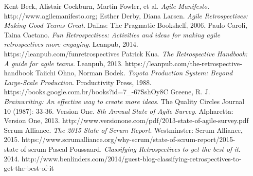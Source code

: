 \begin{thebibliography}{7} 

 Kent Beck, Alistair Cockburn, Martin Fowler, et al. \textit{Agile Manifesto}. http://www.agilemanifesto.org;
 Esther Derby, Diana Larsen. \textit{Agile Retrospectives: Making Good Teams Great}. Dallas: The Pragmatic Bookshelf, 2006.
 Paulo Caroli, Taina Caetano. \textit{Fun Retrospectives: Activities and ideas for making agile retrospectives more engaging}. Leanpub, 2014. https://leanpub.com/funretrospectives
 Patrick Kua. \textit{The Retrospective Handbook: A guide for agile teams}. Leanpub, 2013. https://leanpub.com/the-retrospective-handbook
 Taiichi Ohno, Norman Bodek. \textit{Toyota Production System: Beyond Large-Scale Production}. Productivity Press, 1988. https://books.google.com.br/books?id=7\_-67SshOy8C
 Greene, R. J. \textit{Brainwriting: An effective way to create more ideas}. The Quality Circles Journal 10 (1987): 33-36.
 Version One. \textit{8th Annual State of Agile Survey}. Alpharetta: Version One, 2013. http://www.versionone.com/pdf/2013-state-of-agile-survey.pdf
 Scrum Alliance. \textit{The 2015 State of Scrum Report}. Westminster: Scrum Alliance, 2015. https://www.scrumalliance.org/why-scrum/state-of-scrum-report/2015-state-of-scrum
 Pascal Poussaard. \textit{Classifying Retrospectives to get the best of it}. 2014. http://www.benlinders.com/2014/guest-blog-classifying-retrospectives-to-get-the-best-of-it

\end{thebibliography}
